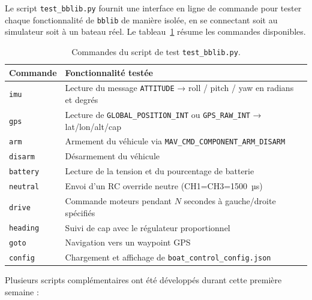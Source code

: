 Le script \texttt{test\_bblib.py} fournit une interface en ligne de commande pour tester chaque fonctionnalité de \texttt{bblib} de manière isolée, en se connectant soit au simulateur soit à un bateau réel. Le tableau~\ref{tab:test_bblib} résume les commandes disponibles.

\begin{table}[h]
  \centering
  \caption{Commandes du script de test \texttt{test\_bblib.py}.}
  \label{tab:test_bblib}
  \renewcommand{\arraystretch}{1.3}
  \begin{tabular}{p{} p{}}
    \toprule
    \textbf{Commande} & \textbf{Fonctionnalité testée} \\
    \midrule
    \texttt{imu}         & Lecture du message \texttt{ATTITUDE} → roll / pitch / yaw en radians et degrés \\
    \texttt{gps}         & Lecture de \texttt{GLOBAL\_POSITION\_INT} ou \texttt{GPS\_RAW\_INT} → lat/lon/alt/cap \\
    \texttt{arm}         & Armement du véhicule via \texttt{MAV\_CMD\_COMPONENT\_ARM\_DISARM} \\
    \texttt{disarm}      & Désarmement du véhicule \\
    \texttt{battery}     & Lecture de la tension et du pourcentage de batterie \\
    \texttt{neutral}     & Envoi d'un RC override neutre (CH1=CH3=1500~µs) \\
    \texttt{drive}       & Commande moteurs pendant $N$ secondes à gauche/droite spécifiés \\
    \texttt{heading}     & Suivi de cap avec le régulateur proportionnel \\
    \texttt{goto}        & Navigation vers un waypoint GPS \\
    \texttt{config}      & Chargement et affichage de \texttt{boat\_control\_config.json} \\
    \bottomrule
  \end{tabular}
\end{table}

Plusieurs scripts complémentaires ont été développés durant cette première semaine :

